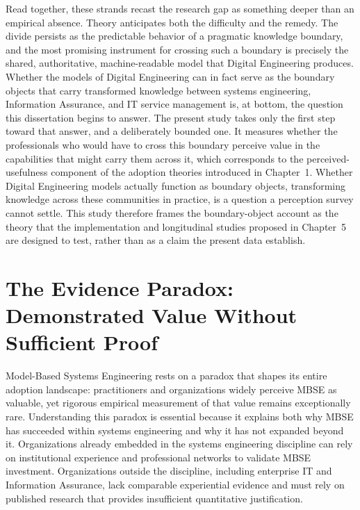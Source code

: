 Read together, these strands recast the research gap as something deeper than an empirical absence. Theory anticipates both the difficulty and the remedy. The divide persists as the predictable behavior of a pragmatic knowledge boundary, and the most promising instrument for crossing such a boundary is precisely the shared, authoritative, machine-readable model that Digital Engineering produces. Whether the models of Digital Engineering can in fact serve as the boundary objects that carry transformed knowledge between systems engineering, Information Assurance, and IT service management is, at bottom, the question this dissertation begins to answer. The present study takes only the first step toward that answer, and a deliberately bounded one. It measures whether the professionals who would have to cross this boundary perceive value in the capabilities that might carry them across it, which corresponds to the perceived-usefulness component of the adoption theories introduced in Chapter~1. Whether Digital Engineering models actually function as boundary objects, transforming knowledge across these communities in practice, is a question a perception survey cannot settle. This study therefore frames the boundary-object account as the theory that the implementation and longitudinal studies proposed in Chapter~5 are designed to test, rather than as a claim the present data establish.

\section{The Evidence Paradox: Demonstrated Value Without Sufficient Proof}

Model-Based Systems Engineering rests on a paradox that shapes its entire adoption landscape: practitioners and organizations widely perceive MBSE as valuable, yet rigorous empirical measurement of that value remains exceptionally rare. Understanding this paradox is essential because it explains both why MBSE has succeeded within systems engineering and why it has not expanded beyond it. Organizations already embedded in the systems engineering discipline can rely on institutional experience and professional networks to validate MBSE investment. Organizations outside the discipline, including enterprise IT and Information Assurance, lack comparable experiential evidence and must rely on published research that provides insufficient quantitative justification.

